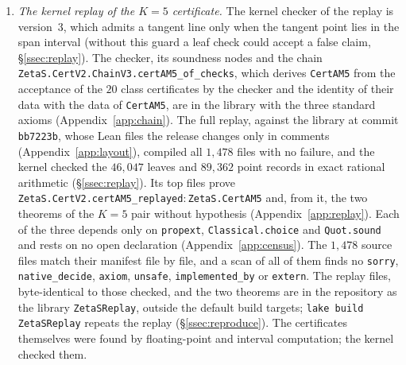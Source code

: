 \begin{enumerate}[label=(\alph*)]
of the six headline theorems gives only the three standard axioms (Appendix~\ref{app:census}). The fourteen statements of record (the six headline
statements, their six cumulative forms on $0<\Im\rho\le T$ and two non-vacuity companions) are in the comparator package of the library
(Appendix~\ref{app:record}), and all fourteen are proved with the three standard axioms. For the $K=5$ pair the
hypothesis is discharged by the kernel replay, (a) and (c). The $K=7$ certificate and the certificate behind Theorem~\ref{thm:S} are too
large for kernel replay on the hardware used (\S\ref{ssec:replay}) and stay as displayed hypotheses.
\item \emph{The kernel replay of the $K=5$ certificate.} The kernel checker of the replay is version~3, which admits a tangent line only
when the tangent point lies in the span interval (without this guard a leaf check could accept a false claim, \S\ref{ssec:replay}). The
checker, its soundness nodes and the chain \texttt{ZetaS.CertV2.\allowbreak ChainV3.\allowbreak certAM5\_of\_checks}, which derives
\texttt{CertAM5} from the acceptance of the $20$ class certificates by the checker and the identity of their data with the data of
\texttt{CertAM5}, are in the library with the three standard axioms (Appendix~\ref{app:chain}). The full replay, against the library at
commit \texttt{bb7223b}, whose Lean files the release changes only in comments (Appendix~\ref{app:layout}), compiled all $1{,}478$ files
with no failure, and the kernel checked the $46{,}047$ leaves and $89{,}362$ point records in exact rational
arithmetic (\S\ref{ssec:replay}). Its top files prove \texttt{ZetaS.CertV2.\allowbreak certAM5\_replayed}${}:{}$\texttt{ZetaS.CertAM5} and,
from it, the two theorems of the $K=5$ pair without hypothesis (Appendix~\ref{app:replay}). Each of
the three depends only on \texttt{propext}, \texttt{Classical.choice} and \texttt{Quot.sound} and rests on no open declaration
(Appendix~\ref{app:census}). The
$1{,}478$ source files match their manifest file by file, and a scan of all of them finds no \texttt{sorry}, \texttt{native\_decide},
\texttt{axiom}, \texttt{unsafe}, \texttt{implemented\_by} or \texttt{extern}. The replay files, byte-identical to those
checked, and the two theorems are in the repository as the library \texttt{ZetaSReplay}, outside the default build targets;
\texttt{lake build ZetaSReplay} repeats the replay (\S\ref{ssec:reproduce}). The certificates themselves were
found by floating-point and interval computation; the kernel checked them.
\end{enumerate}

